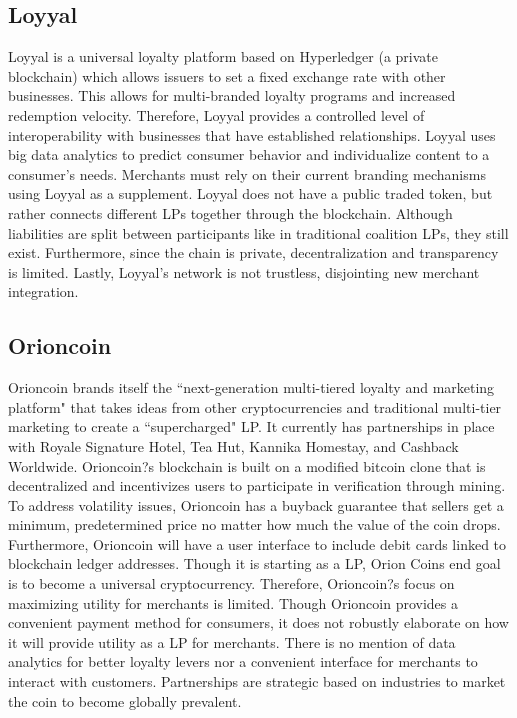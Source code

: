 \subsection{Loyyal}
Loyyal \cite{Loyal17} is a universal loyalty platform based on Hyperledger (a private blockchain) which allows issuers to set a fixed exchange rate with other businesses. This allows for multi-branded loyalty programs and increased redemption velocity. Therefore, Loyyal provides a controlled level of interoperability with businesses that have established relationships. Loyyal uses big data analytics to predict consumer behavior and individualize content to a consumer's needs. Merchants must rely on their current branding mechanisms using Loyyal as a supplement. Loyyal does not have a public traded token, but rather connects different LPs together through the blockchain. Although liabilities are split between participants like in traditional coalition LPs, they still exist. Furthermore, since the chain is private, decentralization and transparency is limited. Lastly, Loyyal's network is not trustless, disjointing new merchant integration.

\subsection{Orioncoin}
Orioncoin \cite{ORC17} brands itself the ``next-generation multi-tiered loyalty and marketing platform" that takes ideas from other cryptocurrencies and traditional multi-tier marketing to create a ``supercharged" LP. It currently has partnerships in place with Royale Signature Hotel, Tea Hut,  Kannika Homestay, and Cashback Worldwide. Orioncoin?s blockchain is built on a modified bitcoin clone that is decentralized and incentivizes users to participate in verification through mining. To address volatility issues, Orioncoin has a buyback guarantee that sellers get a minimum, predetermined price no matter how much the value of the coin drops. Furthermore, Orioncoin will have a user interface to include debit cards linked to blockchain ledger addresses. Though it is starting as a LP, Orion Coins end goal is to become a universal cryptocurrency. Therefore, Orioncoin?s focus on maximizing utility for merchants is limited. Though Orioncoin provides a convenient payment method for consumers, it does not robustly elaborate on how it will provide utility as a LP for merchants. There is no mention of data analytics for better loyalty levers nor a convenient interface for merchants to interact with customers. Partnerships are strategic based on industries to market the coin to become globally prevalent.

